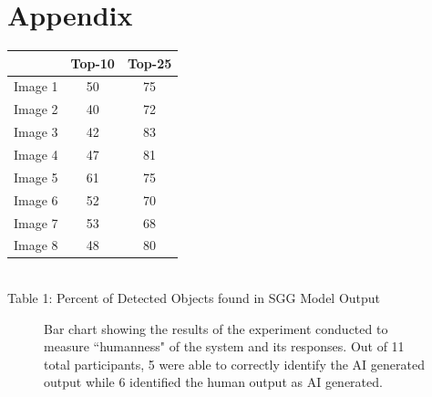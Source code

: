 \documentclass[letterpaper, 10 pt, conference]{ieeeconf}  %
\begin{document}
\section{Appendix}
\vspace*{3mm}
\centering
    \begin{tabular}{|c|c|c|}
        \hline
         & Top-10 & Top-25 \\
        \hline
        Image 1 & 50 & 75\\
        Image 2 & 40 & 72\\
        Image 3 & 42 & 83\\
        Image 4 & 47 & 81\\
        Image 5 & 61 & 75\\
        Image 6 & 52 & 70\\
        Image 7 & 53 & 68\\
        Image 8 & 48 & 80\\
        \hline

    \end{tabular}
    \\
    \vspace*{3mm}
    {Table 1: Percent of Detected Objects found in SGG Model Output}
    \begin{figure}[h]
        \centering
        \caption{Bar chart showing the results of the experiment conducted to measure ``humanness" of the system and its responses. Out of 11 total participants, 5 were able to correctly identify the AI generated output while 6 identified the human output as AI generated.}
      \end{figure}
    



\end{document}
